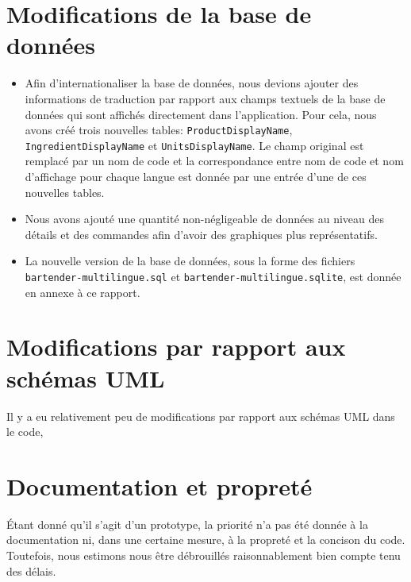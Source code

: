 \documentclass[a4paper,10pt]{article}
\begin{document}
\section{Modifications de la base de données}

\begin{itemize}
    \item Afin d'internationaliser la base de données, nous devions ajouter des informations de traduction par rapport aux champs textuels de la base de données qui sont affichés directement dans l'application. Pour cela, nous avons créé trois nouvelles tables: \texttt{ProductDisplayName}, \texttt{IngredientDisplayName} et \texttt{UnitsDisplayName}. Le champ original est remplacé par un nom de code et la correspondance entre nom de code et nom d'affichage pour chaque langue est donnée par une entrée d'une de ces nouvelles tables.
    \item Nous avons ajouté une quantité non-négligeable de données au niveau des détails et des commandes afin d'avoir des graphiques plus représentatifs.
    \item La nouvelle version de la base de données, sous la forme des fichiers \texttt{bartender-multilingue.sql} et \texttt{bartender-multilingue.sqlite}, est donnée en annexe à ce rapport.
\end{itemize}

\section{Modifications par rapport aux schémas UML}

Il y a eu relativement peu de modifications par rapport aux schémas UML dans le code, 

\section{Documentation et propreté}

Étant donné qu'il s'agit d'un prototype, la priorité n'a pas été donnée à la documentation ni, dans une certaine mesure, à la propreté et la concison du code. Toutefois, nous estimons nous être débrouillés raisonnablement bien compte tenu des délais.
\end{document}
